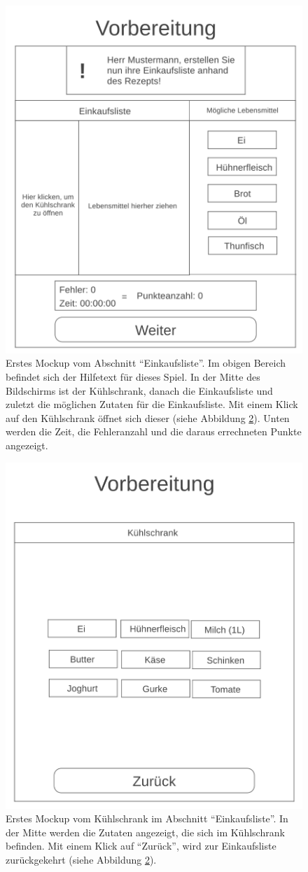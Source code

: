 \begin{figure}[H]
    \centering
	\includegraphics[width=0.5\linewidth]{figures/development/mockup/shopping-list.png}
	\caption{Erstes Mockup vom Abschnitt \enquote{Einkaufsliste}. Im obigen Bereich befindet sich der Hilfetext für dieses Spiel. In der Mitte des Bildschirms ist der Kühlschrank, danach die Einkaufsliste und zuletzt die möglichen Zutaten für die Einkaufsliste. Mit einem Klick auf den Kühlschrank öffnet sich dieser (siehe Abbildung \ref{fig:mockup-refriderator}). Unten werden die Zeit, die Fehleranzahl und die daraus errechneten Punkte angezeigt.}
	\label{fig:mockup-shopping-list}
\end{figure}

\begin{figure}[H]
    \centering
	\includegraphics[width=0.5\linewidth]{figures/development/mockup/refriderator.png}
	\caption{Erstes Mockup vom Kühlschrank im Abschnitt \enquote{Einkaufsliste}. In der Mitte werden die Zutaten angezeigt, die sich im Kühlschrank befinden. Mit einem Klick auf \enquote{Zurück}, wird zur Einkaufsliste zurückgekehrt (siehe Abbildung \ref{fig:mockup-refriderator}).}
	\label{fig:mockup-refriderator}
\end{figure}

